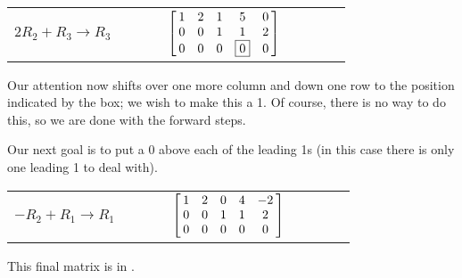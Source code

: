 {\begin{center}\begin{tabular}{ccl}
\parbox{70pt}{\centering\small $2R_2+R_3\rightarrow R_3$}
&$\quad \quad$&
$\bmx{ccccc}1&2&1&5&0\\0&0&1&1&2\\0&0&0&\fbox{0}&0\emx$
\end{tabular}\end{center}

Our attention now shifts over one more column and down one row to the position indicated by the box; we wish to make this a 1. Of course, there is no way to do this, so we are done with the forward steps.

Our next goal is to put a 0 above each of the leading 1s (in this case there is only one leading 1 to deal with). 

\begin{center}\begin{tabular}{ccl}
\parbox{70pt}{\centering\small $-R_2+R_1\rightarrow R_1$}
&$\quad \quad$&
$\bmx{ccccc}1&2&0&4&-2\\0&0&1&1&2\\0&0&0&0&0\emx$
\end{tabular}\end{center}

This final matrix is in \rref.}\\ %


